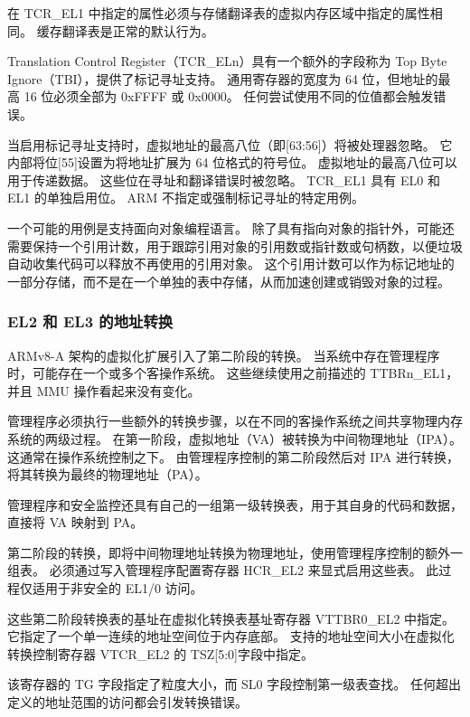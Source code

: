 在 TCR\_EL1 中指定的属性必须与存储翻译表的虚拟内存区域中指定的属性相同。
缓存翻译表是正常的默认行为。


Translation Control Register（TCR\_ELn）具有一个额外的字段称为 Top Byte Ignore（TBI），提供了标记寻址支持。
通用寄存器的宽度为 64 位，但地址的最高 16 位必须全部为 0xFFFF 或 0x0000。
任何尝试使用不同的位值都会触发错误。

当启用标记寻址支持时，虚拟地址的最高八位（即{[}63:56{]}）将被处理器忽略。
它内部将位{[}55{]}设置为将地址扩展为 64 位格式的符号位。
虚拟地址的最高八位可以用于传递数据。
这些位在寻址和翻译错误时被忽略。
TCR\_EL1 具有 EL0 和 EL1 的单独启用位。
ARM 不指定或强制标记寻址的特定用例。

一个可能的用例是支持面向对象编程语言。
除了具有指向对象的指针外，可能还需要保持一个引用计数，用于跟踪引用对象的引用数或指针数或句柄数，以便垃圾自动收集代码可以释放不再使用的引用对象。
这个引用计数可以作为标记地址的一部分存储，而不是在一个单独的表中存储，从而加速创建或销毁对象的过程。

\subsubsection{EL2 和 EL3 的地址转换}

ARMv8-A 架构的虚拟化扩展引入了第二阶段的转换。
当系统中存在管理程序时，可能存在一个或多个客操作系统。
这些继续使用之前描述的 TTBRn\_EL1，并且 MMU 操作看起来没有变化。

管理程序必须执行一些额外的转换步骤，以在不同的客操作系统之间共享物理内存系统的两级过程。
在第一阶段，虚拟地址（VA）被转换为中间物理地址（IPA）。
这通常在操作系统控制之下。
由管理程序控制的第二阶段然后对 IPA 进行转换，将其转换为最终的物理地址（PA）。

管理程序和安全监控还具有自己的一组第一级转换表，用于其自身的代码和数据，直接将 VA 映射到 PA。


第二阶段的转换，即将中间物理地址转换为物理地址，使用管理程序控制的额外一组表。
必须通过写入管理程序配置寄存器 HCR\_EL2 来显式启用这些表。
此过程仅适用于非安全的 EL1/0 访问。

这些第二阶段转换表的基址在虚拟化转换表基址寄存器 VTTBR0\_EL2 中指定。
它指定了一个单一连续的地址空间位于内存底部。
支持的地址空间大小在虚拟化转换控制寄存器 VTCR\_EL2 的 TSZ{[}5:0{]}字段中指定。

该寄存器的 TG 字段指定了粒度大小，而 SL0 字段控制第一级表查找。
任何超出定义的地址范围的访问都会引发转换错误。

